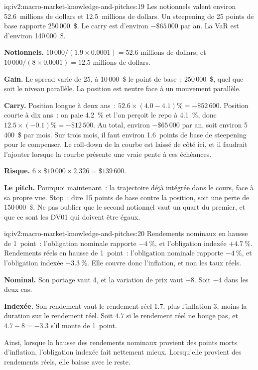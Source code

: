 \begin{solution}{iq:iv2:macro-market-knowledge-and-pitches:19}
Les notionnels valent environ 52.6~millions de dollars et 12.5~millions de dollars. Un steepening de 25 points de base rapporte 250\,000~\$. Le carry est d'environ $-\$65\,000$ par an. La VaR est d'environ 140\,000~\$.

\textbf{Notionnels.} $10\,000/(1.9 \times 0.0001) = 52.6$ millions de dollars, et $10\,000/(8 \times 0.0001) = 12.5$ millions de dollars.

\textbf{Gain.} Le spread varie de 25, à 10\,000~\$ le point de base~: 250\,000~\$, quel que soit le niveau parallèle. La position est neutre face à un mouvement parallèle.

\textbf{Carry.} Position longue à deux ans~: $52.6 \times (4.0 - 4.1)\% = -\$52\,600$. Position courte à dix ans~: on paie 4.2~\% et l'on perçoit le repo à 4.1~\%, donc $12.5 \times (-0.1)\% = -\$12\,500$. Au total, environ $-\$65\,000$ par an, soit environ 5\,400~\$ par mois. Sur trois mois, il faut environ 1.6~points de base de steepening pour le compenser. Le roll-down de la courbe est laissé de côté ici, et il faudrait l'ajouter lorsque la courbe présente une vraie pente à ces échéances.

\textbf{Risque.} $6 \times \$10\,000 \times 2.326 = \$139\,600$.

\textbf{Le pitch.} Pourquoi maintenant~: la trajectoire déjà intégrée dans le cours, face à sa propre vue. Stop~: dire 15 points de base contre la position, soit une perte de 150\,000~\$. Ne pas oublier que le second notionnel vaut un quart du premier, et que ce sont les DV01 qui doivent être égaux.

\end{solution}

\begin{solution}{iq:iv2:macro-market-knowledge-and-pitches:20}
Rendements nominaux en hausse de 1~point~: l'obligation nominale rapporte $-4~\%$, et l'obligation indexée $+4.7~\%$. Rendements réels en hausse de 1~point~: l'obligation nominale rapporte $-4~\%$, et l'obligation indexée $-3.3~\%$. Elle couvre donc l'inflation, et non les taux réels.

\textbf{Nominal.} Son portage vaut 4, et la variation de prix vaut $-8$. Soit $-4$ dans les deux cas.

\textbf{Indexée.} Son rendement vaut le rendement réel 1.7, plus l'inflation 3, moins la duration sur le rendement réel. Soit $4.7$ si le rendement réel ne bouge pas, et $4.7 - 8 = -3.3$ s'il monte de 1~point.

Ainsi, lorsque la hausse des rendements nominaux provient des points morts d'inflation, l'obligation indexée fait nettement mieux. Lorsqu'elle provient des rendements réels, elle baisse avec le reste.

\end{solution}

